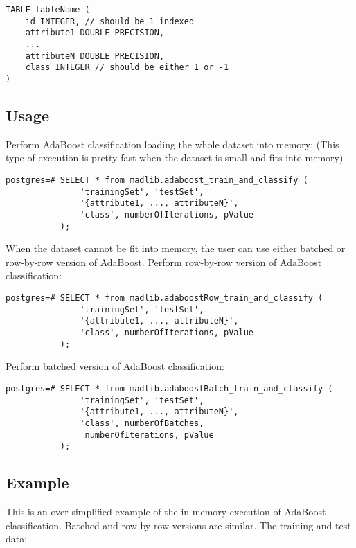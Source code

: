 \begin{verbatim}
TABLE tableName (
    id INTEGER, // should be 1 indexed
    attribute1 DOUBLE PRECISION,
    ...
    attributeN DOUBLE PRECISION,
    class INTEGER // should be either 1 or -1
)
\end{verbatim}

\subsection*{Usage}
Perform AdaBoost classification loading the whole dataset into memory: (This type of execution is pretty fast when the dataset is small and fits into memory)

\begin{verbatim}
postgres=# SELECT * from madlib.adaboost_train_and_classify (
               'trainingSet', 'testSet', 
               '{attribute1, ..., attributeN}', 
               'class', numberOfIterations, pValue
           );
\end{verbatim}

When the dataset cannot be fit into memory, the user can use either batched or row-by-row version of AdaBoost.
\vspace{\baselineskip}
{\raggedleft Perform row-by-row version of AdaBoost classification:}

\begin{verbatim}
postgres=# SELECT * from madlib.adaboostRow_train_and_classify (
               'trainingSet', 'testSet', 
               '{attribute1, ..., attributeN}', 
               'class', numberOfIterations, pValue
           );
\end{verbatim}

{\raggedleft Perform batched version of AdaBoost classification:}

\begin{verbatim}
postgres=# SELECT * from madlib.adaboostBatch_train_and_classify (
               'trainingSet', 'testSet', 
               '{attribute1, ..., attributeN}', 
               'class', numberOfBatches,
                numberOfIterations, pValue
           );
\end{verbatim}

\subsection*{Example}
This is an over-simplified example of the in-memory execution of AdaBoost classification. Batched and row-by-row versions are similar.
\vspace{\baselineskip}
{\raggedleft The training and test data:}

